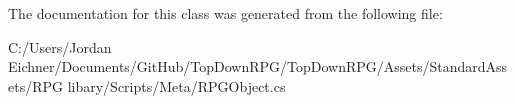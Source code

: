 The documentation for this class was generated from the following file\+:\begin{DoxyCompactItemize}
\item 
C\+:/\+Users/\+Jordan Eichner/\+Documents/\+Git\+Hub/\+Top\+Down\+R\+P\+G/\+Top\+Down\+R\+P\+G/\+Assets/\+Standard\+Assets/\+R\+P\+G libary/\+Scripts/\+Meta/R\+P\+G\+Object.\+cs\end{DoxyCompactItemize}
